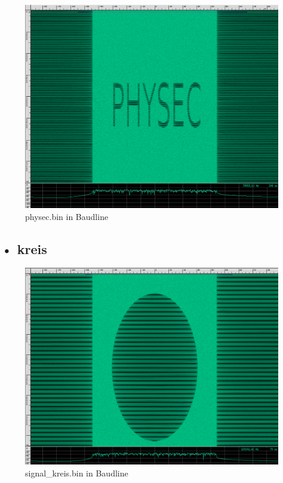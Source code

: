 \documentclass[12pt,a4paper]{article}
\begin{document}
\begin{figure}[hbt!]
	\centering
		\includegraphics[width=1\textwidth ]
		{Bilder/A2_physec.png}
		\caption{physec.bin in Baudline}
\end{figure}



\newpage
\subsection*{• kreis}

\begin{figure}[hbt!]
	\centering
		\includegraphics[width=1\textwidth ]
		{Bilder/A2_kreis.png}
		\caption{signal\_kreis.bin in Baudline}
\end{figure}
\clearpage
\end{document}
